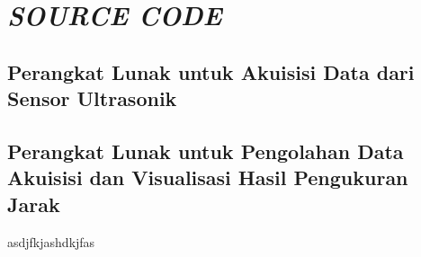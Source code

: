 \cleardoublepage
\chapter{\textit{SOURCE CODE}}
\section{Perangkat Lunak untuk Akuisisi Data dari Sensor Ultrasonik}
%   
\section{Perangkat Lunak untuk Pengolahan Data Akuisisi dan Visualisasi Hasil Pengukuran Jarak} 
asdjfkjashdkjfas
